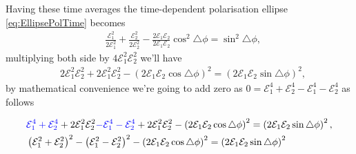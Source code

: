         Having these time averages the time-dependent polarisation ellipse \ref{eq:EllipsePolTime} becomes
        \begin{align*}
            & \frac{\mathcal{E}_1^2}{2\mathcal{E}_1^2} + \frac{\mathcal{E}_2^2}{2\mathcal{E}_2^2} - \frac{2 \mathcal{E}_1\mathcal{E}_2}{2\mathcal{E}_1\mathcal{E}_2}\cos^2\triangle\phi = \sin^2\triangle\phi,
        \end{align*}
        multiplying both side by $4\mathcal{E}_1^2\mathcal{E}_2^2$ we'll have
        \begin{align*}
            & 2\mathcal{E}_1^2\mathcal{E}_2^2 + 2\mathcal{E}_1^2\mathcal{E}_2^2 - \left(2\mathcal{E}_1\mathcal{E}_2\cos\triangle\phi\right)^2 = \left(2\mathcal{E}_1\mathcal{E}_2\sin\triangle\phi\right)^2,
        \end{align*}
        by mathematical convenience we're going to add zero as $0 = \mathcal{E}_1^4 + \mathcal{E}_2^4 - \mathcal{E}_1^4 - \mathcal{E}_2^4$ as follows
        
        \begin{align*}
            & \text{\color{blue}$\mathcal{E}_1^4 + \mathcal{E}_2^4$} + 2\mathcal{E}_1^2\mathcal{E}_2^2 \text{\color{blue}$-\mathcal{E}_1^4 - \mathcal{E}_2^4$} + 2\mathcal{E}_1^2\mathcal{E}_2^2 - \left(2\mathcal{E}_1\mathcal{E}_2\cos\triangle\phi\right)^2 = \left(2\mathcal{E}_1\mathcal{E}_2\sin\triangle\phi\right)^2,\\
            & \left(\mathcal{E}_1^2 + \mathcal{E}_2^2 \right)^2 - \left(\mathcal{E}_1^2 - \mathcal{E}_2^2\right)^2 - \left(2\mathcal{E}_1\mathcal{E}_2\cos\triangle\phi\right)^2 = \left(2\mathcal{E}_1\mathcal{E}_2\sin\triangle\phi\right)^2
        \end{align*}

